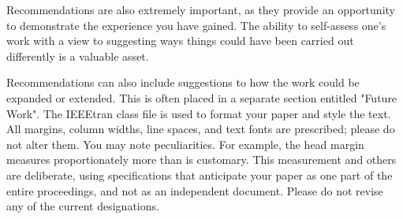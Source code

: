 Recommendations are also extremely important, as they provide an opportunity to demonstrate the experience you have gained. The ability to self-assess one's work with a view to suggesting ways things could have been carried out differently is a valuable asset.

Recommendations can also include suggestions to how the work could be expanded or extended. This is often placed in a separate section entitled "Future Work".
The IEEEtran class file is used to format your paper and style the text. All margins, 
column widths, line spaces, and text fonts are prescribed; please do not 
alter them. You may note peculiarities. For example, the head margin
measures proportionately more than is customary. This measurement 
and others are deliberate, using specifications that anticipate your paper 
as one part of the entire proceedings, and not as an independent document. 
Please do not revise any of the current designations.

